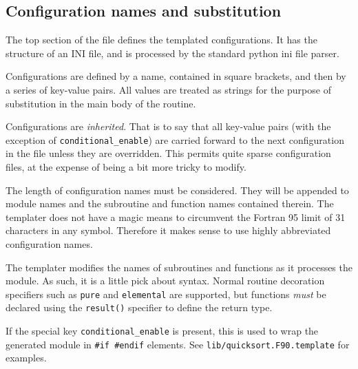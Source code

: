 \documentclass[a4paper,notitlepage,dvipsnames]{scrreprt}
\let\code\lstinline
\begin{document}
\subsection{Configuration names and substitution}
	The top section of the file defines the templated configurations. It has
	the structure of an INI file, and is processed by the standard python ini
	file parser.

	Configurations are defined by a name, contained in square brackets, and
	then by a series of key-value pairs. All values are treated as strings for
	the purpose of substitution in the main body of the routine.

	Configurations are \emph{inherited}. That is to say that all key-value
	pairs (with the exception of \code{conditional_enable}) are carried
	forward to the next configuration in the file unless they are overridden.
	This permits quite sparse configuration files, at the expense of being
	a bit more tricky to modify.

	The length of configuration names must be considered. They will be appended
	to module names and the subroutine and function names contained therein.
	The templater does not have a magic means to circumvent the Fortran 95
	limit of 31 characters in any symbol. Therefore it makes sense to use
	highly abbreviated configuration names.

	The templater modifies the names of subroutines and functions as it
	processes the module. As such, it is a little pick about syntax. Normal
	routine decoration specifiers such as \code{pure} and
	\code{elemental} are supported, but functions \emph{must} be declared
	using the \code{result()} specifier to define the return type.

	If the special key \code{conditional_enable} is present, this is used
	to wrap the generated module in \code{#if #endif} elements. See
	\code{lib/quicksort.F90.template} for examples.
\end{document}
